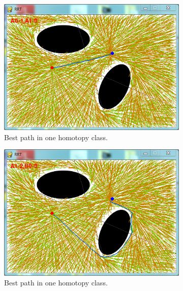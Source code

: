 \documentclass[letterpaper, 10 pt, conference]{ieeeconf}
\begin{document}
\begin{figure}
	\centering
	\begin{subfigure}[t]{0.47\linewidth}
		\centering
		\includegraphics[width=\textwidth]{fig/all_homotopy3.png}
		\caption{Best path in one homotopy class.}
		\label{fig:all_homotopy:01}
	\end{subfigure}  
	\begin{subfigure}[t]{0.47\linewidth}
		\centering
		\includegraphics[width=\textwidth]{fig/all_homotopy1.png}
		\caption{Best path in one homotopy class.}
		\label{fig:all_homotopy:02}
	\end{subfigure}
	\\
	\begin{subfigure}[t]{0.47\linewidth}

\end{subfigure}
\end{figure}
\end{document}
